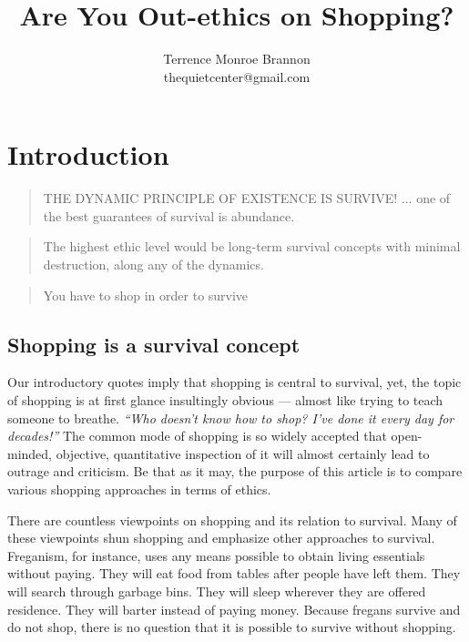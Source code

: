 \documentclass{article}%
\begin{document}
\title{Are You Out-ethics on Shopping?}
\author{Terrence Monroe Brannon \\
thequietcenter@gmail.com }
\maketitle

\tableofcontents

\section{Introduction}

\begin{quotation}
THE DYNAMIC PRINCIPLE OF EXISTENCE IS SURVIVE! ... one of the best guarantees of survival is abundance.
\end{quotation}

\begin{quotation}
The highest ethic level would be long-term survival concepts with minimal destruction, along any of the dynamics.
\end{quotation}


\begin{quotation}
You have to shop in order to survive
\end{quotation}

\subsection{Shopping is a survival concept}

Our introductory quotes imply that shopping is central to survival, yet, the topic of shopping is at first glance insultingly obvious --- almost like trying to teach someone to breathe. \emph{``Who doesn't know how to shop? I've done it every day for decades!''} The common mode of shopping is so widely accepted that open-minded, objective, quantitative inspection of it will almost certainly lead to outrage and criticism. Be that as it may, the purpose of this article is to compare various shopping approaches in terms of ethics.

There are countless viewpoints on shopping and its relation to survival. Many of these viewpoints shun shopping and emphasize other approaches to survival. Freganism, for instance, uses any means possible to obtain living essentials without paying. They will eat food from tables after people have left them. They will search through garbage bins. They will sleep wherever they are offered residence. They will barter instead of paying money. Because fregans survive and do not shop, there is no question that it is possible to survive without shopping.
\end{document}
